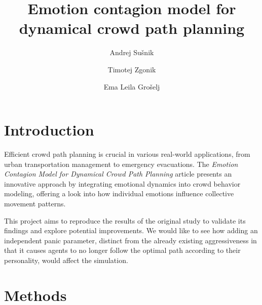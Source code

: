 \documentclass[9pt]{pnas-new}
\title{Emotion contagion model for dynamical crowd path planning}
\author{Andrej Sušnik}
\author{Timotej Zgonik}
\author{Ema Leila Grošelj}
\affil{Collective behaviour course research seminar report}
\begin{document}
\verticaladjustment{-2pt}

\maketitle
\thispagestyle{firststyle}


\section{Introduction}
Efficient crowd path planning is crucial in various real-world applications, from urban transportation management to emergency evacuations. The \textit{Emotion Contagion Model for Dynamical Crowd Path Planning} article presents an innovative approach by integrating emotional dynamics into crowd behavior modeling, offering a look into how individual emotions influence collective movement patterns.

This project aims to reproduce the results of the original study to validate its findings and explore potential improvements. We would like to see how adding an independent panic parameter, distinct from the already existing aggressiveness in that it causes agents to no longer follow the optimal path according to their personality, would affect the simulation.

\section{Methods}
\end{document}
